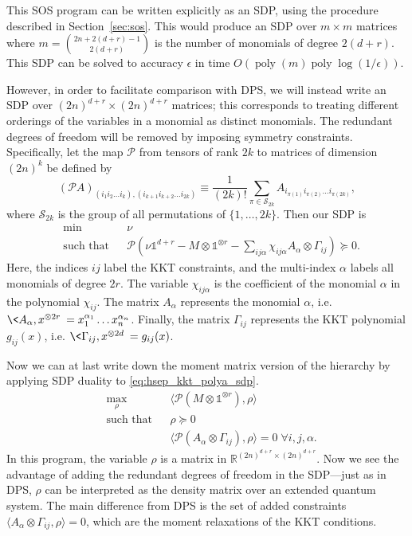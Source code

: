 \documentclass[aps,pra,notitlepage,preprintnumbers,11pt,tightenlines]{revtex4-1}
\renewcommand{\P}{\mathcal{P}}
\newcommand{\RR}{\mathbb{R}}
\newcommand{\ident}{\mathbb{1}}
\newcommand{\ot}{\otimes}
\DeclareMathOperator{\poly}{poly}
\begin{document}
This SOS program can be written explicitly as an SDP, using the
procedure described in Section~\ref{sec:sos}. This would produce an
SDP over $m \times m$ matrices where $m = \binom{2n + 2(d+r) -
  1}{2(d+r)}$ is the number of monomials of degree
$2(d+r)$. This SDP can be solved to accuracy $\epsilon$ in time
$O(\poly(m) \poly\log(1/\epsilon))$. 

However, in order to facilitate comparison with DPS, we will
instead write an SDP over $(2n)^{d+r} \times (2n)^{d+r}$
matrices; this corresponds to treating different orderings of the
variables in a monomial as distinct monomials. The redundant degrees
of freedom will be removed by imposing symmetry
constraints. 
Specifically, let the map $\P$ from tensors of rank
$2k$ to matrices of dimension $(2n)^{k}$ be defined by
\[ (\P A)_{(i_1 i_2 \dots i_k), (i_{k+1} i_{k+2} \dots i_{2k})} \equiv \frac{1}{(2k)!} \sum_{\pi \in
  \mathcal{S}_{2k}} A_{i_{\pi(1)} i_{\pi(2)} \dots
  i_{\pi(2k)} } , \]
where $\mathcal{S}_{2k}$ is the group of all permutations of $\{1, \dots, 2k\}$.
Then our SDP is
\begin{equation}
\label{eq:hsep_kkt_polya_sdp}
\begin{aligned}
  &\min && \nu \\
  &\text{such that} && \P \left( \nu \ident^{d+r} - M \otimes
    \ident^{\otimes r} - \sum_{ij\alpha} \chi_{ij\alpha} A_\alpha \otimes \Gamma_{ij}
  \right) \succeq 0.
\end{aligned}
\end{equation}
Here, the indices $ij$ label the KKT constraints, and
the multi-index $\alpha$ labels all monomials of degree $2r$. The
variable $\chi_{ij\alpha}$ is the coefficient of the monomial
$\alpha$ in the polynomial $\chi_{ij}$. The matrix $A_\alpha$
represents the monomial $\alpha$, i.e. $\<A_\alpha, x^{\ot 2r}\> =
x_1^{\alpha_1} \dots x_n^{\alpha_n}$. Finally, the matrix
$\Gamma_{ij}$ represents the KKT polynomial $g_{ij}(x)$,
i.e. $\<\Gamma_{ij}, x^{\ot 2d} \>= g_{ij}(x)$.

Now we can at last write down the moment matrix version of the
hierarchy by applying SDP duality to \eqref{eq:hsep_kkt_polya_sdp}.
\begin{equation}
  \label{eq:hsep_kkt_moment}
  \begin{aligned}
    &\max_{\rho} && \langle \P(M \otimes \ident^{\otimes r}), \rho \rangle \\
    &\text{such that} && \rho \succeq 0 \\
    &&& \langle \P(A_\alpha \otimes \Gamma_{ij} ), \rho \rangle = 0
    \; \forall i, j, \alpha.
  \end{aligned}
\end{equation}
In this program, the variable $\rho$ is a matrix in $\RR^{(2n)^{d+r} \times (2n)^{d+r}}$. Now we see the advantage of adding the redundant degrees of
freedom in the SDP---just as in DPS, $\rho$ can be interpreted as the density matrix
over an extended quantum system. The main difference from DPS
is the set of added constraints $\langle A_\alpha \otimes \Gamma_{ij}, \rho
\rangle = 0$, which are the moment relaxations of the KKT
conditions.
\end{document}
